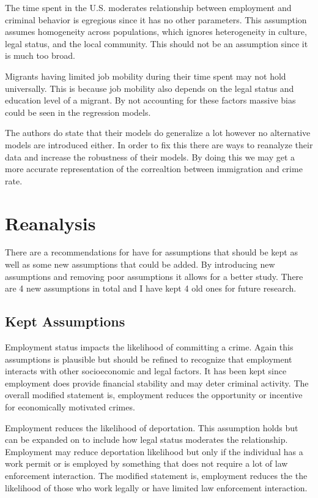 \documentclass[12pt,letterpaper]{article}
\begin{document}
    \indent The time spent in the U.S. moderates relationship between employment and criminal behavior is egregious since it has no other parameters. This assumption assumes homogeneity across populations, which ignores heterogeneity in culture, legal status, and the local community. This should not be an assumption since it is much too broad.

    \indent Migrants having limited job mobility during their time spent may not hold universally. This is because job mobility also depends on the legal status and education level of a migrant. By not accounting for these factors massive bias could be seen in the regression models.

    \indent The authors do state that their models do generalize a lot however no alternative models are introduced either. In order to fix this there are ways to reanalyze their data and increase the robustness of their models. By doing this we may get a more accurate representation of the correaltion between immigration and crime rate.
    
\section{Reanalysis}
        \indent There are a recommendations for have for assumptions that should be kept as well as some new assumptions that could be added. By introducing new assumptions and removing poor assumptions it allows for a better study. There are 4 new assumptions in total and I have kept 4 old ones for future research.
        
    \subsection{Kept Assumptions}
            \indent Employment status impacts the likelihood of committing a crime. Again this assumptions is plausible but should be refined to recognize that employment interacts with other socioeconomic and legal factors. It has been kept since employment does provide financial stability and may deter criminal activity. The overall modified statement is, employment reduces the opportunity or incentive for economically motivated crimes.

            \indent Employment reduces the likelihood of deportation. This assumption holds but can be expanded on to include how legal status moderates the relationship. Employment may reduce deportation likelihood but only if the individual has a work permit or is employed by something that does not require a lot of law enforcement interaction. The modified statement is, employment reduces the the likelihood of those who work legally or have limited law enforcement interaction.
\end{document}
